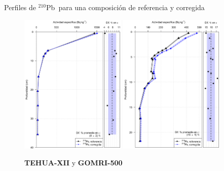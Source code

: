 \documentclass[9pt]{beamer}
\newcommand{\PbCero}{$^{210}$Pb}
\begin{document}
\begin{frame}{Perfiles de \PbCero\, para una composición de referencia y corregida}
	\begin{figure}
		\centering
		\includegraphics[width=0.45\textwidth]{Imagenes/Act_210Pb_Agua_Composicion_TEHUA-XII.png}
		\includegraphics[width=0.45\textwidth]{Imagenes/Act_210Pb_Agua_Composicion_GOMRI_500.png}
		\caption{ \textbf{TEHUA-XII} y \textbf{GOMRI-500}}
	\end{figure}
\end{frame}
\end{document}
